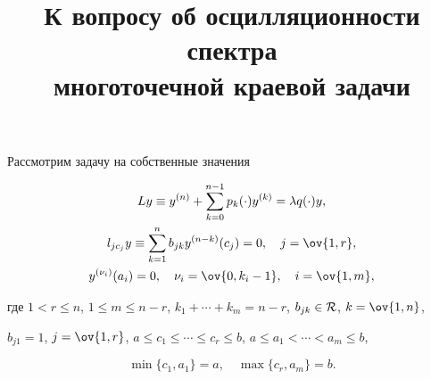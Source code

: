 

\title{К вопросу об осцилляционности спектра\\ 


многоточечной краевой задачи} 


 


\date{} 




\pagestyle{plain} %


 




\maketitle 


\label{begin} 


 


 


Рассмотрим задачу на собственные значения 


\begin{gather} 


L y\equiv y^{(n)}+\sum^{n-1}_{k=0}p_k(\cdot)y^{(k)}= 


\lambda q(\cdot)y, \\ 


% 


l_{j c_j}y\equiv\sum^n_{k=1}b_{jk}y^{(n-k)}(c_j)=0, 


\quad j=\ov{1,r}, \\ 


% 


y^{(\nu_i)}(a_i)=0,\quad \nu_i=\ov{0,k_i-1},\quad 


i=\ov{1,m},


\end{gather} 


где $1<r\le n$, $1\le m\le n-r$, $k_1+\dotsb+k_m=n-r$, $b_{jk}\in\cal 


R$, $k=\ov{1,n}$, 


$b_{j1}=1$, $j=\ov{1,r}$, $a\le c_1\le\dotsb\le c_r\le b$, $a\le 


a_1<\dotsb<a_m\le b$, 


\begin{equation} 


\min\{c_1,a_1\}=a,\quad \max\{c_r,a_m\}=b. 


\end{equation} 


